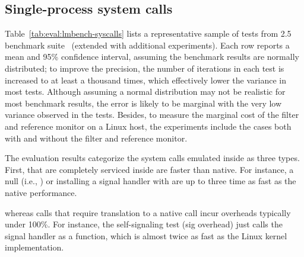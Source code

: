 \subsection{Single-process system calls}
\label{eval:perf:syscalls}


Table~\ref{tab:eval:lmbench-syscalls} lists 
a representative sample of 
tests from \lmbench{} 2.5 benchmark suite~\cite{McVoy:lmbench}
(extended with additional experiments).
Each row reports a mean and 95\% confidence interval,
assuming the benchmark results are normally distributed;
to improve the precision,
the number of iterations in each test is increased to at least a thousand times, which effectively lower the variance
in most tests.
Although assuming a normal distribution may not be realistic for most benchmark results,
the error is likely to be marginal with the very low variance
observed in the tests.
Besides, to measure the marginal cost of the \seccomp{} filter and reference monitor on a Linux host,
the experiments include the cases both with
and without the \seccomp{} filter and reference monitor.


The evaluation results categorize
the system calls emulated inside \thelibos{}
as three types.
First, \linuxapis{} that are completely serviced inside \thelibos{} are faster than native.
For instance,
a null \linuxapi{} (i.e., )
or installing a signal handler with 
are up to three time as fast as
the native performance.


whereas calls that require translation to a native call incur overheads typically under 100\%.
For instance, 
the self-signaling test (sig overhead)
just calls the signal handler as a function,
which is almost twice as fast
as the Linux kernel implementation.  

